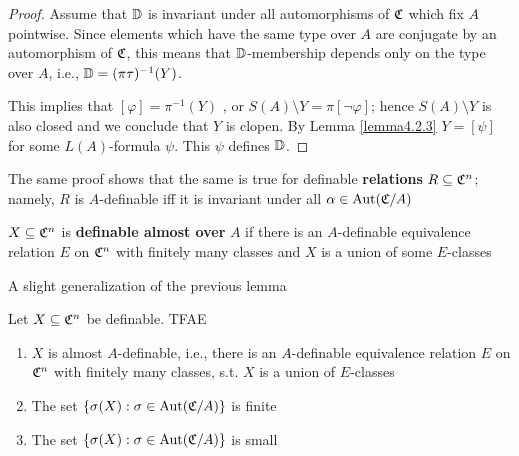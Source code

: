 \documentclass[11pt]{article}
\begin{document}
\begin{proof}
Assume that \(\mathbb{D}\) is invariant under all automorphisms of \(\mathfrak{C}\) which fix \(A\) pointwise. Since
elements which have the same type over \(A\) are conjugate by an automorphism of \(\mathfrak{C}\), this
means that \(\mathbb{D}\)-membership depends only on the type over \(A\), i.e., \(\mathbb{D}=(\pi\tau)^{-1}(Y)\).

This implies that \([\varphi]=\pi^{-1}(Y)\)
, or \(S(A)\setminus Y=\pi[\neg\varphi]\); hence \(S(A)\setminus Y\) is also closed and
we conclude that \(Y\) is clopen. By Lemma \ref{lemma4.2.3} \(Y=[\psi]\) for some \(L(A)\)-formula \(\psi\).
This \(\psi\) defines \(\mathbb{D}\).
\end{proof}

The same proof shows that the same is true for definable \textbf{relations} \(R\subseteq\mathfrak{C}^n\); namely, \(R\)
is \(A\)-definable iff it is invariant under all \(\alpha\in\operatorname{\text{Aut}}(\mathfrak{C}/A)\)

\begin{definition}[]
\(X\subseteq\mathfrak{C}^n\) is \textbf{definable almost over} \(A\) if there is an \(A\)-definable equivalence
relation \(E\) on \(\mathfrak{C}^n\) with finitely many classes and \(X\) is a union of some \(E\)-classes
\end{definition}


A slight generalization of the previous lemma
\begin{lemma}[]
\label{P2.13}
Let \(X\subseteq\mathfrak{C}^n\) be definable. TFAE
\begin{enumerate}
\item \(X\) is almost \(A\)-definable, i.e., there is an \(A\)-definable equivalence relation \(E\)
on \(\mathfrak{C}^n\) with finitely many classes, s.t. \(X\) is a union of \(E\)-classes
\item The set \(\{\sigma(X):\sigma\in\operatorname{\text{Aut}}(\mathfrak{C}/A)\}\) is finite
\item The set \(\{\sigma(X):\sigma\in\operatorname{\text{Aut}}(\mathfrak{C}/A)\}\) is small
\end{enumerate}
\end{lemma}
\end{document}
